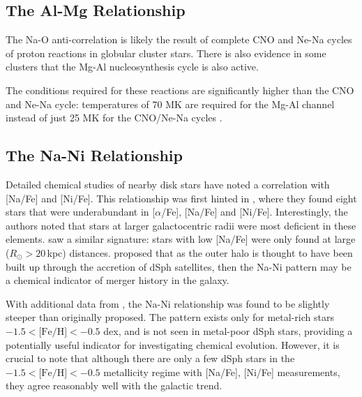 \documentclass{emulateapj}
\begin{document}


\subsection{The Al-Mg Relationship}

The Na-O anti-correlation is likely the result of complete CNO and Ne-Na cycles of proton reactions in globular cluster stars. There is also evidence in some clusters that the Mg-Al nucleosynthesis cycle is also active. 

 The conditions required for these reactions are significantly higher than the CNO and Ne-Na cycle: temperatures of 70 MK are required for the Mg-Al channel instead of just 25 MK for the CNO/Ne-Na cycles \citet{charbonnel;prantzos_2006}. 


\subsection{The Na-Ni Relationship}

Detailed chemical studies of nearby disk stars have noted a correlation with [Na/Fe] and [Ni/Fe]. This relationship was first hinted in \citet{nissen;schuster_1997}, where they found eight stars that were underabundant in [$\alpha$/Fe], [Na/Fe] and [Ni/Fe]. Interestingly, the authors noted that stars at larger galactocentric radii were most deficient in these elements. \citet{fulbright_2000} saw a similar signature: stars with low [Na/Fe] were only found at large ($R_\odot > 20$\,kpc) distances. \citet{nissen;schuster_1997} proposed that as the outer halo is thought to have been built up through the accretion of dSph satellites, then the Na-Ni pattern may be a chemical indicator of merger history in the galaxy.

With additional data from \citet{nissen;schuster_2011}, the Na-Ni relationship was found to be slightly steeper than originally proposed. The pattern exists only for metal-rich stars $-1.5 < \mbox{[Fe/H]} < -0.5$ dex, and is not seen in metal-poor dSph stars, providing a potentially useful indicator for investigating chemical evolution. However, it is crucial to note that although there are only a few dSph stars in the $-1.5 < \mbox{[Fe/H]} < -0.5$ metallicity regime with [Na/Fe], [Ni/Fe] measurements, they agree reasonably well with the galactic trend. 
\end{document}
